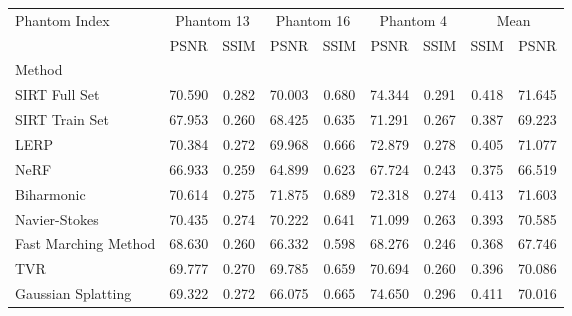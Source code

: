 \begin{tabular}{|l|cc|cc|cc|cc|}
\toprule
Phantom Index & \multicolumn{2}{c|}{Phantom 13} & \multicolumn{2}{c|}{Phantom 16} & \multicolumn{2}{c|}{Phantom 4} & \multicolumn{2}{c|}{Mean} \\
 & PSNR & SSIM & PSNR & SSIM & PSNR & SSIM & SSIM & PSNR \\
Method &  &  &  &  &  &  &  &  \\
\midrule
SIRT Full Set & 70.590 & 0.282 & 70.003 & 0.680 & 74.344 & 0.291 & 0.418 & 71.645 \\
SIRT Train Set & 67.953 & 0.260 & 68.425 & 0.635 & 71.291 & 0.267 & 0.387 & 69.223 \\
LERP & \cellcolor{rankthird}70.384 & \cellcolor{rankthird}0.272 & \cellcolor{rankthird}69.968 & \cellcolor{ranksecond}0.666 & \cellcolor{ranksecond}72.879 & \cellcolor{ranksecond}0.278 & \cellcolor{rankthird}0.405 & \cellcolor{ranksecond}71.077 \\
NeRF & \cellcolor{rankworst}66.933 & \cellcolor{rankworst}0.259 & \cellcolor{rankworst}64.899 & 0.623 & \cellcolor{rankworst}67.724 & \cellcolor{rankworst}0.243 & 0.375 & \cellcolor{rankworst}66.519 \\
Biharmonic & \cellcolor{rankfirst}70.614 & \cellcolor{rankfirst}0.275 & \cellcolor{rankfirst}71.875 & \cellcolor{rankfirst}0.689 & \cellcolor{rankthird}72.318 & \cellcolor{rankthird}0.274 & \cellcolor{rankfirst}0.413 & \cellcolor{rankfirst}71.603 \\
Navier-Stokes & \cellcolor{ranksecond}70.435 & \cellcolor{ranksecond}0.274 & \cellcolor{ranksecond}70.222 & 0.641 & 71.099 & 0.263 & 0.393 & \cellcolor{rankthird}70.585 \\
Fast Marching Method & 68.630 & 0.260 & 66.332 & \cellcolor{rankworst}0.598 & 68.276 & 0.246 & \cellcolor{rankworst}0.368 & 67.746 \\
TVR & 69.777 & 0.270 & 69.785 & 0.659 & 70.694 & 0.260 & 0.396 & 70.086 \\
Gaussian Splatting & 69.322 & \cellcolor{rankthird}0.272 & 66.075 & \cellcolor{rankthird}0.665 & \cellcolor{rankfirst}74.650 & \cellcolor{rankfirst}0.296 & \cellcolor{ranksecond}0.411 & 70.016 \\
\bottomrule
\end{tabular}
